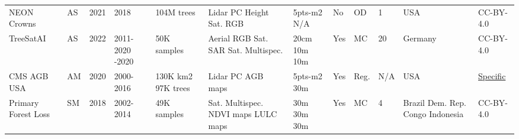 \documentclass{CUP-JNL-DTM}%
\theoremstyle{definition}
\numberwithin{equation}{section}
\begin{document}
\begin{table*}[ht]
{\begin{fntable}
\begin{adjustwidth}{-0.7cm}{}
\begin{tabular}{p{1.2cm} | p{0.3cm} | p{0.4cm} | p{1cm} | p{1.4cm} | p{1.4cm} : p{1.5cm} | p{0.4cm} | p{0.7cm} | p{1cm} | p{1cm} | p{1.1cm}}
NEON Crowns	\cite{weinstein_remote_2021} & AS & 2021 & 2018  & 104M trees & Lidar PC \newline Height \newline Sat. RGB & 5pts-m2 \newline N/A \newline 10cm & No & OD  & 1 & USA & CC-BY-4.0 \\

TreeSatAI \cite{ahlswede_treesatai_2022} & AS & 2022 & 2011-2020 -2020 & 50K samples & Aerial RGB \newline Sat. SAR \newline Sat. Multispec. & 20cm \newline 10m \newline 10m & Yes & MC & 20 & Germany	& CC-BY-4.0 \\

CMS AGB USA	\cite{hudak_carbon_2020} & AM & 2020 & 2000-2016 & 130K km2 \newline 97K trees & Lidar PC \newline AGB maps & 5pts-m2 \newline 30m & Yes & Reg. & N/A & USA & \href{https://www.earthdata.nasa.gov/learn/use-data/data-use-policy?}{Specific} \\

Primary Forest Loss	\cite{turubanova_ongoing_2018} & SM & 2018 & 2002-2014 & 49K samples & Sat. Multispec. \newline NDVI maps \newline LULC maps & 30m \newline 30m \newline 30m & Yes & MC & 4 & Brazil \newline Dem. Rep. Congo \newline Indonesia & CC-BY-4.0 \\


\bottomrule


\end{tabular}
\end{adjustwidth}
\end{fntable}}
\end{table*}
\end{document}
